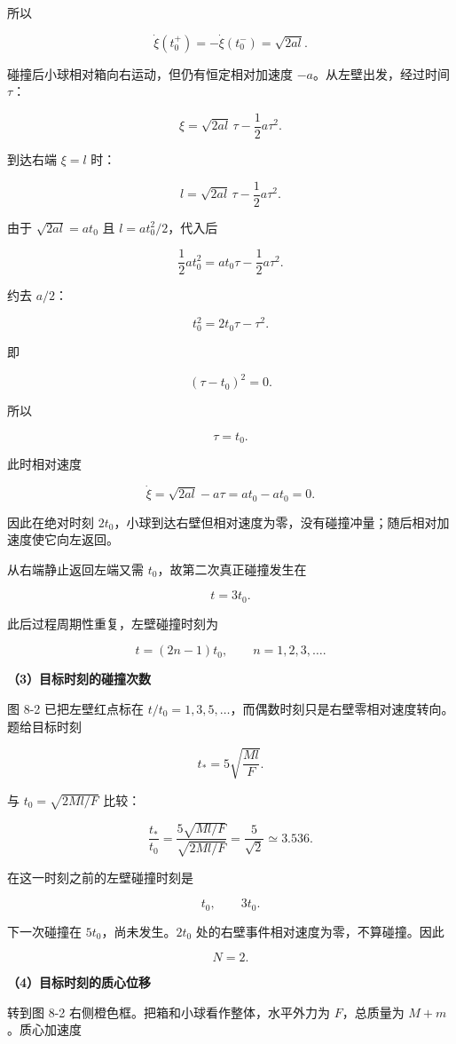 \documentclass[12pt,a4paper,UTF8]{ctexart}
\begin{document}
所以

\[
\dot\xi(t_0^+)=-\dot\xi(t_0^-)=\sqrt{2al}.
\]

碰撞后小球相对箱向右运动，但仍有恒定相对加速度
\(-a\)。从左壁出发，经过时间 \(\tau\)：

\[
\xi=\sqrt{2al}\,\tau-\frac12a\tau^2.
\]

到达右端 \(\xi=l\) 时：

\[
l=\sqrt{2al}\,\tau-\frac12a\tau^2.
\]

由于 \(\sqrt{2al}=at_0\) 且 \(l=at_0^2/2\)，代入后

\[
\frac12at_0^2=at_0\tau-\frac12a\tau^2.
\]

约去 \(a/2\)：

\[
t_0^2=2t_0\tau-\tau^2.
\]

即

\[
(\tau-t_0)^2=0.
\]

所以

\[\tau=t_0.\]

此时相对速度

\[
\dot\xi=\sqrt{2al}-a\tau=at_0-at_0=0.
\]

因此在绝对时刻
\(2t_0\)，小球到达右壁但相对速度为零，没有碰撞冲量；随后相对加速度使它向左返回。

从右端静止返回左端又需 \(t_0\)，故第二次真正碰撞发生在

\[t=3t_0.\]

此后过程周期性重复，左壁碰撞时刻为

\[
\boxed{t=(2n-1)t_0,\qquad n=1,2,3,\ldots}.
\]

\textbf{（3）目标时刻的碰撞次数}

图 8-2 已把左壁红点标在
\(t/t_0=1,3,5,\ldots\)，而偶数时刻只是右壁零相对速度转向。题给目标时刻

\[
t_*=5\sqrt{\frac{Ml}{F}}.
\]

与 \(t_0=\sqrt{2Ml/F}\) 比较：

\[
\frac{t_*}{t_0}
=\frac{5\sqrt{Ml/F}}{\sqrt{2Ml/F}}
=\frac5{\sqrt2}
\simeq3.536.
\]

在这一时刻之前的左壁碰撞时刻是

\[t_0,\qquad 3t_0.\]

下一次碰撞在 \(5t_0\)，尚未发生。\(2t_0\)
处的右壁事件相对速度为零，不算碰撞。因此

\[
\boxed{N=2}.
\]

\textbf{（4）目标时刻的质心位移}

转到图 8-2 右侧橙色框。把箱和小球看作整体，水平外力为 \(F\)，总质量为
\(M+m\)。质心加速度
\end{document}
